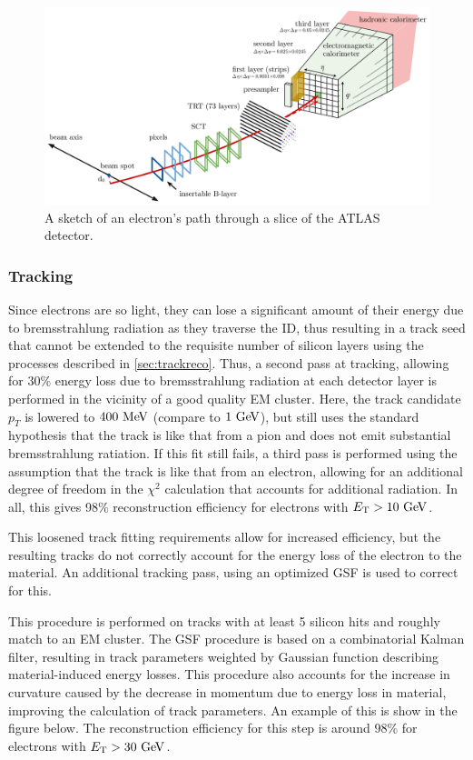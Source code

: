 \begin{figure}[htbp]
\centering
\includegraphics[width=.8\textwidth]{figures/EventReconstruction/electron-reco-sketch.png}
\caption{A sketch of an electron's path through a slice of the \ac{ATLAS} detector.}
\label{fig:elec_reco_sketch}
\end{figure}

\subsubsection{Tracking}
Since electrons are so light, they can lose a significant amount of their energy due to bremsstrahlung radiation as they traverse the \ac{ID}, thus resulting in a track seed that cannot be extended to the requisite number of silicon layers using the processes described in \autoref{sec:trackreco}. Thus, a second pass at tracking, allowing for 30\% energy loss due to bremsstrahlung radiation at each detector layer is performed in the vicinity of a good quality \ac{EM} cluster. Here, the track candidate $p_{T}$ is lowered to $400 \MeV$ (compare to $1 \GeV$), but still uses the standard hypothesis that the track is like that from a pion and does not emit substantial bremsstrahlung ratiation. If this fit still fails, a third pass is performed using the assumption that the track is like that from an electron, allowing for an additional degree of freedom in the $\chi^2$ calculation that accounts for additional radiation. In all, this gives 98\% reconstruction efficiency for electrons with $\et > 10 \GeV$. 

This loosened track fitting requirements allow for increased efficiency, but the resulting tracks do not correctly account for the energy loss of the electron to the material. An additional tracking pass, using an optimized \acf{GSF} is used to correct for this. 

This procedure is performed on tracks with at least 5 silicon hits and roughly match to an \ac{EM} cluster. The \ac{GSF} procedure is based on a combinatorial Kalman filter, resulting in track parameters weighted by Gaussian function describing material-induced energy losses. This procedure also accounts for the increase in curvature caused by the decrease in momentum due to energy loss in material, improving the calculation of track parameters. An example of this is show in the figure below. The reconstruction efficiency for this step is around 98\% for electrons with $\et > 30 \GeV$. 

